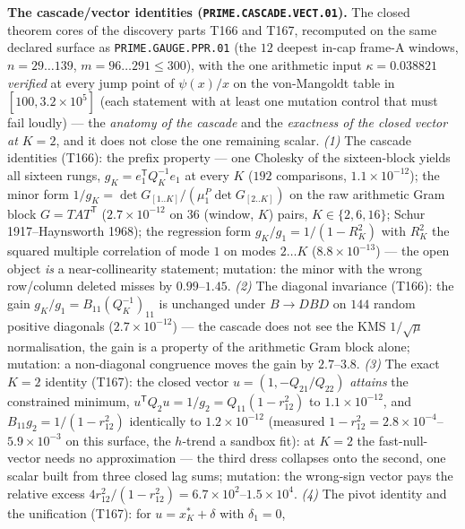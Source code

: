 \par\smallskip\noindent\textbf{The cascade/vector identities
(\texttt{PRIME.CASCADE.VECT.01}).}
The closed theorem cores of the discovery parts T166 and T167,
recomputed on the same declared surface as
\texttt{PRIME.GAUGE.PPR.01} (the $12$ deepest in-cap frame-A windows,
$n=29\ldots139$, $m=96\ldots291\le300$), with the one arithmetic input
$\kappa=0.038821$ \emph{verified} at every jump point of $\psi(x)/x$ on
the von-Mangoldt table in $[100,3.2\times10^{5}]$ (each statement with
at least one mutation control that must fail loudly) --- the
\emph{anatomy of the cascade} and the \emph{exactness of the closed
vector at $K=2$}, and it does not close the one remaining scalar.
\emph{(1)} The cascade identities (T166): the prefix property --- one
Cholesky of the sixteen-block yields all sixteen rungs,
$g_K=e_1^{\mathsf T}Q_K^{-1}e_1$ at every $K$ ($192$ comparisons,
$1.1\times10^{-12}$); the minor form
$1/g_K=\det G_{[1..K]}/(\mu^P_1\det G_{[2..K]})$ on the raw arithmetic
Gram block $G=TAT^{\mathsf T}$ ($2.7\times10^{-12}$ on $36$ (window,
$K$) pairs, $K\in\{2,6,16\}$; Schur 1917--Haynsworth 1968); the
regression form $g_K/g_1=1/(1-R_K^2)$ with $R_K^2$ the squared multiple
correlation of mode $1$ on modes $2\ldots K$ ($8.8\times10^{-13}$) ---
the open object \emph{is} a near-collinearity statement; mutation: the
minor with the wrong row/column deleted misses by $0.99$--$1.45$.
\emph{(2)} The diagonal invariance (T166): the gain
$g_K/g_1=B_{11}(Q_K^{-1})_{11}$ is unchanged under $B\to DBD$ on $144$
random positive diagonals ($2.7\times10^{-12}$) --- the cascade does
not see the KMS $1/\sqrt{\mu}$ normalisation, the gain is a property of
the arithmetic Gram block alone; mutation: a non-diagonal congruence
moves the gain by $2.7$--$3.8$. \emph{(3)} The exact $K=2$ identity
(T167): the closed vector $u=(1,-Q_{21}/Q_{22})$ \emph{attains} the
constrained minimum, $u^{\mathsf T}Q_2u=1/g_2=Q_{11}(1-r_{12}^2)$ to
$1.1\times10^{-12}$, and $B_{11}g_2=1/(1-r_{12}^2)$ identically to
$1.2\times10^{-12}$ (measured
$1-r_{12}^2=2.8\times10^{-4}$--$5.9\times10^{-3}$ on this surface, the
$h$-trend a sandbox fit): at $K=2$ the fast-null-vector needs no
approximation --- the third dress collapses onto the second, one scalar
built from three closed lag sums; mutation: the wrong-sign vector pays
the relative excess
$4r_{12}^2/(1-r_{12}^2)=6.7\times10^{2}$--$1.5\times10^{4}$.
\emph{(4)} The pivot identity and the unification (T167): for
$u=x^*_K+\delta$ with $\delta_1=0$,
